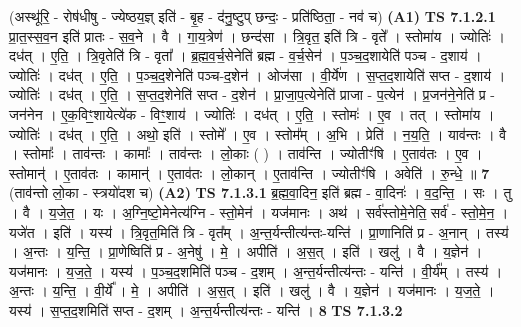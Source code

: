 \documentclass[17pt]{extarticle}
\begin{document}
                  \newline
                      (अस्थू॑रि॒ - रोष॑धीषु - ज्येष्ठय॒ज्ञ् इति॑ - बृ॒ह - द॑नु॒ष्टुप् छन्दः॒ - प्रति॑ष्ठिता॒ - नव॑ च)  \textbf{(A1)} \newline \newline
                                \textbf{ TS 7.1.2.1} \newline
                  प्रा॒त॒स्स॒व॒न इति॑ प्रातः - स॒व॒ने । वै । गा॒य॒त्रेण॑ । छन्द॑सा । त्रि॒वृत॒ इति॑ त्रि - वृते᳚ । स्तोमा॑य । ज्योतिः॑ । दध॑त् । ए॒ति॒ । त्रि॒वृतेति॑ त्रि - वृता᳚ । ब्र॒ह्म॒व॒र्च॒सेनेति॑ ब्रह्म - व॒र्च॒सेन॑ । प॒ञ्च॒द॒शायेति॑ पञ्च - द॒शाय॑ । ज्योतिः॑ । दध॑त् । ए॒ति॒ । प॒ञ्च॒द॒शेनेति॑ पञ्च-द॒शेन॑ । ओज॑सा । वी॒र्ये॑ण । स॒प्त॒द॒शायेति॑ सप्त - द॒शाय॑ । ज्योतिः॑ । दध॑त् । ए॒ति॒ । स॒प्त॒द॒शेनेति॑ सप्त - द॒शेन॑ । प्रा॒जा॒प॒त्येनेति॑ प्राजा - प॒त्येन॑ । प्र॒जन॑ने॒नेति॑ प्र - जन॑नेन । ए॒क॒विꣳ॒॒शायेत्ये॑क - विꣳ॒॒शाय॑ । ज्योतिः॑ । दध॑त् । ए॒ति॒ । स्तोमः॑ । ए॒व । तत् । स्तोमा॑य । ज्योतिः॑ । दध॑त् । ए॒ति॒ । अथो॒ इति॑ । स्तोमे᳚ । ए॒व । स्तोम᳚म् । अ॒भि । प्रेति॑ । न॒य॒ति॒ । याव॑न्तः । वै । स्तोमाः᳚ । ताव॑न्तः । कामाः᳚ । ताव॑न्तः । लो॒काः ( ) । ताव॑न्ति । ज्योतीꣳ॑षि । ए॒ताव॑तः । ए॒व । स्तोमान्॑ । ए॒ताव॑तः । कामान्॑ । ए॒ताव॑तः । लो॒कान् । ए॒ताव॑न्ति । ज्योतीꣳ॑षि । अवेति॑ । रु॒न्धे॒ ॥ \textbf{  7} \newline
                  \newline
                      (ताव॑न्तो लो॒का - स्त्रयो॑दश च)  \textbf{(A2)} \newline \newline
                                \textbf{ TS 7.1.3.1} \newline
                  ब्र॒ह्म॒वा॒दिन॒ इति॑ ब्रह्म - वा॒दिनः॑ । व॒द॒न्ति॒ । सः । तु । वै । य॒जे॒त॒ । यः । अ॒ग्नि॒ष्टो॒मेनेत्य॑ग्नि - स्तो॒मेन॑ । यज॑मानः । अथ॑ । सर्व॑स्तोमे॒नेति॒ सर्व॑ - स्तो॒मे॒न॒ । यजे॑त । इति॑ । यस्य॑ । त्रि॒वृत॒मिति॑ त्रि - वृत᳚म् । अ॒न्त॒र्यन्तीत्य॑न्तः-यन्ति॑ । प्रा॒णानिति॑ प्र - अ॒नान् । तस्य॑ । अ॒न्तः । य॒न्ति॒ । प्रा॒णेष्विति॑ प्र - अ॒नेषु॑ । मे॒ । अपीति॑ । अ॒स॒त् । इति॑ । खलु॑ । वै । य॒ज्ञेन॑ । यज॑मानः । य॒ज॒ते॒ । यस्य॑ । प॒ञ्च॒द॒शमिति॑ पञ्च - द॒शम् । अ॒न्त॒र्यन्तीत्य॑न्तः - यन्ति॑ । वी॒र्य᳚म् । तस्य॑ । अ॒न्तः । य॒न्ति॒ । वी॒र्ये᳚ । मे॒ । अपीति॑ । अ॒स॒त् । इति॑ । खलु॑ । वै । य॒ज्ञेन॑ । यज॑मानः । य॒ज॒ते॒ । यस्य॑ । स॒प्त॒द॒शमिति॑ सप्त - द॒शम् । अ॒न्त॒र्यन्तीत्य॑न्तः - यन्ति॑ । \textbf{  8} \newline
                  \newline
                                \textbf{ TS 7.1.3.2} \newline
\end{document}
